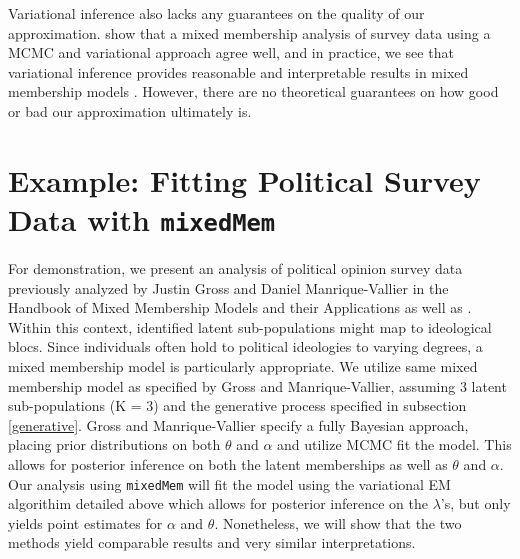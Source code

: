 \documentclass{article}\usepackage[]{graphicx}\usepackage[]{color}
\begin{document}
Variational inference also lacks any guarantees on the quality of our approximation. \cite{erosheva2007describing} show that a mixed membership analysis of survey data using a MCMC and variational approach agree well, and in practice, we see that variational inference provides reasonable and interpretable results in mixed membership models \citep{LDA, erosheva2004mixed, airoldi2009mixed}. However, there are no theoretical guarantees on how good or bad our approximation ultimately is.

\section{Example: Fitting Political Survey Data with \texttt{mixedMem}}
For demonstration, we present an analysis of political opinion survey data previously analyzed by Justin Gross and Daniel Manrique-Vallier in the Handbook of Mixed Membership Models and their Applications \citep[Gross and Manrique-Vallier, CH 6]{Airoldi2014Handbook} as well as \cite{feldman1988structure}. Within this context, identified latent sub-populations might map to ideological blocs. Since individuals often hold to political ideologies to varying degrees, a mixed membership model is particularly appropriate. We utilize same mixed membership model as specified by Gross and Manrique-Vallier, assuming 3 latent sub-populations (K = 3) and the generative process specified in subsection \ref{generative}. Gross and Manrique-Vallier specify a fully Bayesian approach, placing prior distributions on both $\theta$ and $\alpha$ and utilize MCMC fit the model. This allows for posterior inference on both the latent memberships as well as $\theta$ and $\alpha$. Our analysis using \texttt{mixedMem} will fit the model using the variational EM algorithim detailed above which allows for posterior inference on the $\lambda$'s, but only yields point estimates for $\alpha$ and $\theta$. Nonetheless, we will show that the two methods yield comparable results and very similar interpretations.
\end{document}
